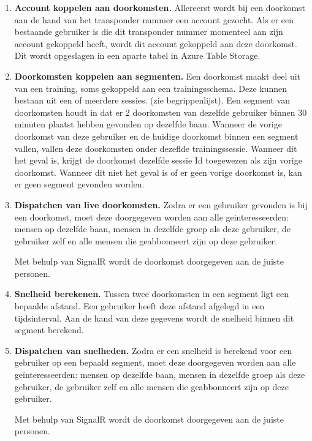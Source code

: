 \begin{enumerate}

\item \textbf{Account koppelen aan doorkomsten.}
Allereerst wordt bij een doorkomst aan de hand van het transponder nummer een account gezocht. Als er een bestaande gebruiker is die dit transponder nummer momenteel aan zijn account gekoppeld heeft, wordt dit account gekoppeld aan deze doorkomst. Dit wordt opgeslagen in een aparte tabel in Azure Table Storage.

\item \textbf{Doorkomsten koppelen aan segmenten.}
Een doorkomst maakt deel uit van een training, soms gekoppeld aan een trainingsschema. Deze kunnen bestaan uit een of meerdere sessies. (zie begrippenlijst). Een segment van doorkomsten houdt in dat er 2 doorkomsten van dezelfde gebruiker binnen 30 minuten plaatst hebben gevonden op dezelfde baan. Wanneer de vorige doorkomst van deze gebruiker en de huidige doorkomst binnen een segment vallen, vallen deze doorkomsten onder dezeflde trainingssessie. Wanneer dit het geval is, krijgt de doorkomst dezelfde sessie Id toegewezen als zijn vorige doorkomst. Wanneer dit niet het geval is of er geen vorige doorkomst is, kan er geen segment gevonden worden.

\item \textbf{Dispatchen van live doorkomsten.}
Zodra er een gebruiker gevonden is bij een doorkomst, moet deze doorgegeven worden aan alle geinteresseerden: mensen op dezelfde baan, mensen in dezelfde groep als deze gebruiker, de gebruiker zelf en alle mensen die geabbonneert zijn op deze gebruiker.

Met behulp van SignalR wordt de doorkomst doorgegeven aan de juiste personen.

\item \textbf{Snelheid berekenen.}
Tussen twee doorkomsten in een segment ligt een bepaalde afstand. Een gebruiker heeft deze afstand afgelegd in een tijdsinterval. Aan de hand van deze gegevens wordt de snelheid binnen dit segment berekend.

\item \textbf{Dispatchen van snelheden.}
Zodra er een snelheid is berekend voor een gebruiker op een bepaald segment, moet deze doorgegeven worden aan alle geïnteresseerden: mensen op dezelfde baan, mensen in dezelfde groep als deze gebruiker, de gebruiker zelf en alle mensen die geabbonneert zijn op deze gebruiker.

Met behulp van SignalR wordt de doorkomst doorgegeven aan de juiste personen.


\end{enumerate}
